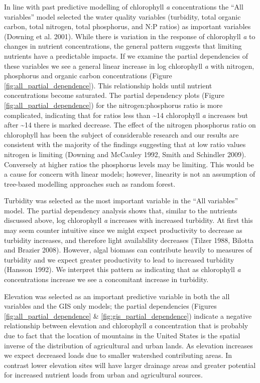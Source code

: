 \documentclass[11pt,]{article}
\begin{document}
In line with past predictive modelling of chlorophyll \emph{a}
concentrations the ``All variables'' model selected the water quality
variables (turbidity, total organic carbon, total nitrogen, total
phosphorus, and N:P ratios) as important variables (Downing et al.
2001). While there is variation in the response of chlorophyll \emph{a}
to changes in nutrient concentrations, the general pattern suggests that
limiting nutrients have a predictable impacts. If we examine the partial
dependencies of these variables we see a general linear increase in log
chlorophyll \emph{a} with nitrogen, phosphorus and organic carbon
concentrations (Figure \ref{fig:all_partial_dependence}). This
relationship holds until nutrient concentrations become saturated. The
partial dependency plots (Figure \ref{fig:all_partial_dependence}) for
the nitrogen:phosphorus ratio is more complicated, indicating that for
ratios less than \textasciitilde{}14 chlorophyll \emph{a} increases but
after \textasciitilde{}14 there is marked decrease. The effect of the
nitrogen phosphorus ratio on chlorophyll has been the subject of
considerable research and our results are consistent with the majority
of the findings suggesting that at low ratio values nitrogen is limiting
(Downing and McCauley 1992, Smith and Schindler 2009). Conversely at
higher ratios the phosphorus levels may be limiting. This would be a
cause for concern with linear models; however, linearity is not an
assumption of tree-based modelling approaches such as random forest.

Turbidity was selected as the most important variable in the ``All
variables'' model. The partial dependency analysis shows that, similar
to the nutrients discussed above, log chlorophyll \emph{a} increases
with increased turbidity. At first this may seem counter intuitive since
we might expect productivity to decrease as turbidity increases, and
therefore light availability decreases (Tilzer 1988, Bilotta and Brazier
2008). However, algal biomass can contribute heavily to measures of
turbidity and we expect greater productivity to lead to increased
turbidity (Hansson 1992). We interpret this pattern as indicating that
as chlorophyll \emph{a} concentrations increase we see a concomitant
increase in turbidity.

Elevation was selected as an important predictive variable in both the
all variables and the GIS only models; the partial dependencies (Figures
\ref{fig:all_partial_dependence} \& \ref{fig:gis_partial_dependence})
indicate a negative relationship between elevation and chlorophyll
\emph{a} concentration that is probably due to fact that the location of
mountains in the United States is the spatial inverse of the
distribution of agricultural and urban lands. As elevation increases we
expect decreased loads due to smaller watershed contributing areas. In
contrast lower elevation sites will have larger drainage areas and
greater potential for increased nutrient loads from urban and
agricultural sources.
\end{document}
